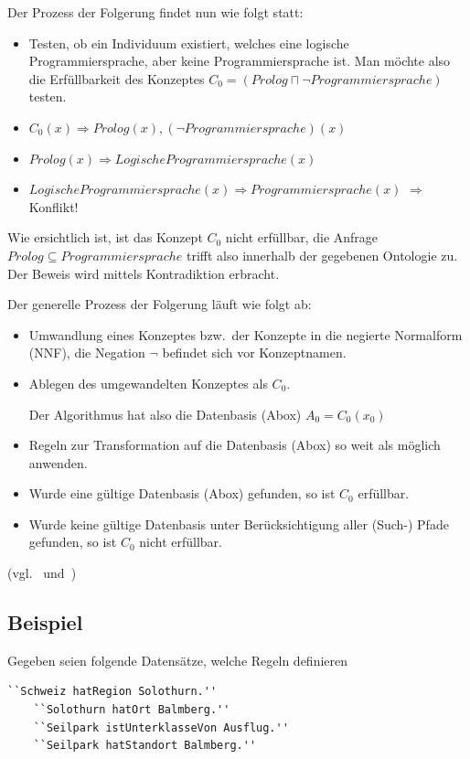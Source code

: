 Der Prozess der Folgerung findet nun wie folgt statt:
\begin{itemize}
    \item Testen, ob ein Individuum existiert, welches eine logische Programmiersprache, aber keine Programmiersprache ist. Man möchte also die Erfüllbarkeit des Konzeptes $ C_0 = (Prolog \sqcap \neg Programmiersprache) $ testen.
    \item $ C_0(x) \Rightarrow Prolog(x), (\neg Programmiersprache)(x) $
    \item $ Prolog(x) \Rightarrow LogischeProgrammiersprache(x) $
    \item $ LogischeProgrammiersprache(x) \Rightarrow Programmiersprache(x) $
        $ \Rightarrow $ Konflikt!
\end{itemize}
Wie ersichtlich ist, ist das Konzept $ C_0 $ nicht erfüllbar, die Anfrage $ Prolog \subseteq Programmiersprache $ trifft also innerhalb der gegebenen Ontologie zu. Der Beweis wird mittels Kontradiktion erbracht.

Der generelle Prozess der Folgerung läuft wie folgt ab:
\begin{itemize}
    \item Umwandlung eines Konzeptes bzw.\ der Konzepte in die negierte Normalform (NNF), die Negation $ \neg $ befindet sich vor Konzeptnamen.
    \item Ablegen des umgewandelten Konzeptes als $ C_0 $.

        Der Algorithmus hat also die Datenbasis (Abox) $ A_0 = {C_0(x_0)} $
    \item Regeln zur Transformation auf die Datenbasis (Abox) so weit als möglich anwenden.
    \item Wurde eine gültige Datenbasis (Abox) gefunden, so ist $ C_0 $ erfüllbar.
    \item Wurde keine gültige Datenbasis unter Berücksichtigung aller (Such-) Pfade gefunden, so ist $ C_0 $ nicht erfüllbar.
\end{itemize} (vgl.~\cite{horrocks2002} und~\cite{horrocks2005})



\subsection{Beispiel}
\label{subsec:inferenz_beispiel}

Gegeben seien folgende Datensätze, welche Regeln definieren

\begin{lstlisting}[caption={Aussagentripel bestehend aus Objekt, Prädikat und Subjekt},captionpos=b,label=lst:reasoning_seilpark]
    ``Schweiz hatRegion Solothurn.''
    ``Solothurn hatOrt Balmberg.''
    ``Seilpark istUnterklasseVon Ausflug.''
    ``Seilpark hatStandort Balmberg.''
\end{lstlisting}

